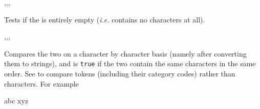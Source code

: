 \documentclass[oneside]{book}
\begin{document}
\begin{function}{\strVarIfEmpty,\strVarIfEmptyT,\strVarIfEmptyF,\strVarIfEmptyTF}
\begin{syntax}
 
  
  
   
\end{syntax}
Tests if the  is entirely empty
(\emph{i.e.} contains no characters at all).
\begin{demohigh}
\strSet {}
\strVarIfEmptyTF {} {}
\strClear \lTmpaStr
\strVarIfEmptyTF {} {}
\end{demohigh}
\end{function}

\begin{function}{\strIfEq,\strIfEqT,\strIfEqF,\strIfEqTF}
\begin{syntax}
  
   
   
    
\end{syntax}
Compares the two  on a character by character
basis (namely after converting them to strings),
and is \texttt{true} if the two  contain the same
characters in the same order.
See  to compare
tokens (including their category codes) rather than characters.
For example
\begin{demohigh}
 {abc} {} {}
 {xyz} {} {}
\end{demohigh}
\end{function}
\end{document}
